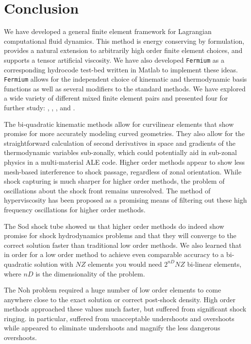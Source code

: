 
\chapter{Conclusion}\label{Conclusion}

We have developed a general finite element framework for Lagrangian computational fluid dynamics. This method is energy conserving by formulation, provides a natural extension to arbitrarily high order finite element choices, and supports a tensor artificial viscosity. We have also developed \texttt{Fermium} as a corresponding hydrocode test-bed written in Matlab to implement these ideas. \texttt{Fermium} allows for the independent choice of kinematic and thermodynamic basis functions as well as several modifiers to the standard methods. We have explored a wide variety of different mixed finite element pairs and presented four for further study: , , , and . 

The bi-quadratic kinematic methods allow for curvilinear elements that show promise for more accurately modeling curved geometries. They also allow for the straightforward calculation of second derivatives in space and gradients of the thermodynamic variables sub-zonally, which could potentially aid in sub-zonal physics in a multi-material ALE code. Higher order methods appear to show less mesh-based interference to shock passage, regardless of zonal orientation. While shock capturing is much sharper for higher order methods, the problem of oscillations about the shock front remains unresolved. The method of hyperviscosity has been proposed as a promising means of filtering out these high frequency oscillations for higher order methods.

The Sod shock tube showed us that higher order methods do indeed show promise for shock hydrodynamics problems and that they will converge to the correct solution faster than traditional low order methods. We also learned that in order for a low order method to achieve even comparable accuracy to a bi-quadratic solution with $NZ$ elements you would need $2^{nD}NZ$ bi-linear elements, where $nD$ is the dimensionality of the problem.

The Noh problem required a huge number of low order elements to come anywhere close to the exact solution or correct post-shock density. High order methods approached these values much faster, but suffered from significant shock ringing.  in particular, suffered from unacceptable undershoots and overshoots while  appeared to eliminate undershoots and magnify the less dangerous overshoots.

